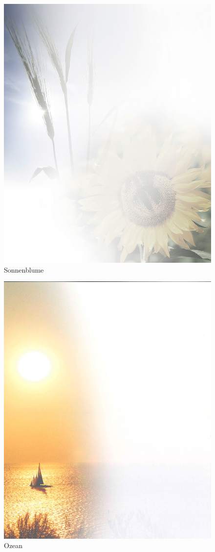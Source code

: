 \documentclass[ngerman,a4paper,11pt]{scrreprt}
\begin{document}
\begin{figure}[H]
\centering
\includegraphics[width=\textwidth,height=.8\textheight]{Bilder/Bilder/750_0010_7300_Hintergrund_Sonnenblume_Todesanzeige.png}
\caption{Sonnenblume}
\end{figure}

\begin{figure}[H]
\centering
\includegraphics[width=\textwidth,height=.8\textheight]{Bilder/Bilder/750_0010_7431_Hintergrund_Sehnsucht_Todesanzeige_1.png}
\caption{Ozean}
\end{figure}
\end{document}
